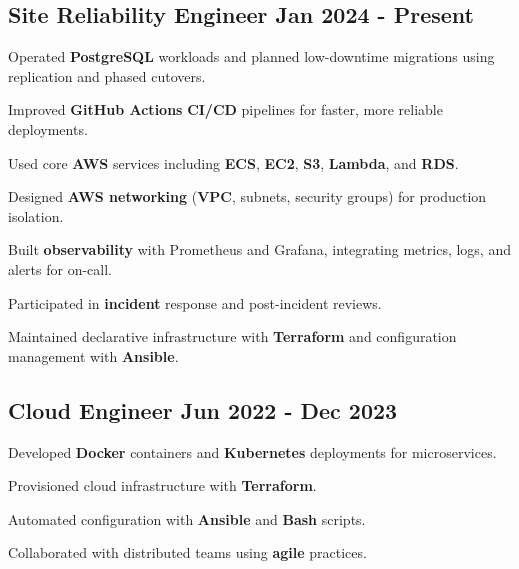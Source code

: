 \documentclass[letter,10pt]{article}
\begin{document}
\subsection{{Site Reliability Engineer \hfill Jan 2024 - Present}}
\begin{zitemize}
  \item Operated \textbf{PostgreSQL} workloads and planned low-downtime migrations using replication and phased cutovers.
  \item Improved \textbf{GitHub Actions} \textbf{CI/CD} pipelines for faster, more reliable deployments.
  \item Used core \textbf{AWS} services including \textbf{ECS}, \textbf{EC2}, \textbf{S3}, \textbf{Lambda}, and \textbf{RDS}.
  \item Designed \textbf{AWS networking} (\textbf{VPC}, subnets, security groups) for production isolation.
  \item Built \textbf{observability} with Prometheus and Grafana, integrating metrics, logs, and alerts for on-call.
  \item Participated in \textbf{incident} response and post-incident reviews.
  \item Maintained declarative infrastructure with \textbf{Terraform} and configuration management with \textbf{Ansible}.
\end{zitemize}

\subsection{{Cloud Engineer \hfill Jun 2022 - Dec 2023}}
\begin{zitemize}
    \item Developed \textbf{Docker} containers and \textbf{Kubernetes} deployments for microservices.
    \item Provisioned cloud infrastructure with \textbf{Terraform}.
    \item Automated configuration with \textbf{Ansible} and \textbf{Bash} scripts.
    \item Collaborated with distributed teams using \textbf{agile} practices.
\end{zitemize}
\end{document}
